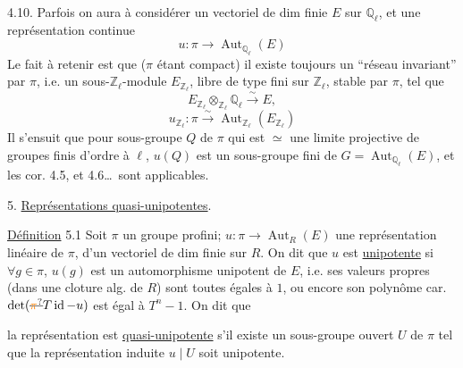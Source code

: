 4.10. Parfois on aura à considérer un vectoriel de dim finie $E$ sur $\mathbb Q_\ell$, et une représentation continue
\[
u:\pi\longrightarrow\operatorname{Aut}_{\mathbb Q_\ell}(E)
\tag*{(4.10.1)}
\]
Le fait à retenir est que ($\pi$ étant compact) il existe toujours un ``réseau invariant'' par $\pi$, i.e. un sous-$\mathbb Z_\ell$-module $E_{\mathbb Z_\ell}$,  libre de type fini sur $\mathbb Z_\ell$, stable par $\pi$, tel que
\[
E_{\mathbb Z_\ell}\otimes_{\mathbb Z_\ell}\mathbb Q_\ell\xrightarrow{\sim}E,
\]
\[
u_{\mathbb Z_\ell}:\pi\xrightarrow{\sim}\operatorname{Aut}_{\mathbb Z_\ell}(E_{\mathbb Z_\ell})
\tag*{(4.10.2)}
\]
Il s'ensuit  que pour  sous-groupe $Q$ de $\pi$ qui est $\simeq$ une limite projective de groupes finis d'ordre  à $\ell$, $u(Q)$ est un sous-groupe fini de $G=\operatorname{Aut}_{\mathbb Q_\ell}(E)$, et les cor. 4.5, et 4.6\ldots\ sont applicables.

5. \uline{Représentations quasi-unipotentes}.

\uline{Définition} 5.1 Soit $\pi$ un groupe profini; $u:\pi\longrightarrow\operatorname{Aut}_R(E)$ une représentation linéaire de $\pi$,   d'un vectoriel de dim finie sur  $R$. On dit que $u$ est  \uline{unipotente} si $\forall g\in\pi$, $u(g)$ est un automorphisme unipotent de $E$, i.e. ses valeurs propres (dans une cloture alg. de $R$) sont toutes égales à $1$, ou encore son polynôme car. $\det(\deleted{\unsure{\pi}}T\operatorname{id}-u)$ est égal à $T^n-1$. On dit que

la représentation  est \uline{quasi-unipotente} s'il existe un sous-groupe ouvert $U$ de $\pi$ tel que la représentation induite $u\mid U$ soit unipotente.

